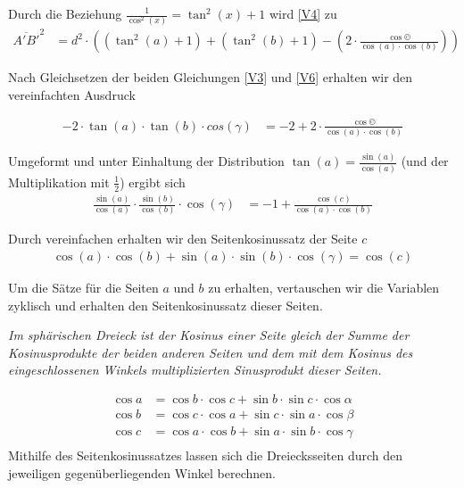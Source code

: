 \begin{refsection}
Durch die Beziehung $\frac{1}{\cos^{2}(x)}=\tan^{2}(x)+1$ wird \eqref{V4} zu 
\begin{align}
\overline{ A'B'}^{ 2 } &= d^{ 2 } \cdot \left(\left(\tan^{ 2 }(a) + 1\right) + \left(\tan^{ 2 }(b) + 1\right) - \left(2 \cdot \frac{\cos©}{\cos(a) \cdot \cos(b)}\right)\right)
\label {V6}
\end{align}

Nach Gleichsetzen der beiden Gleichungen \eqref{V3} und \eqref{V6} erhalten wir den vereinfachten Ausdruck 

\begin{align*}
-2 \cdot \tan(a) \cdot \tan(b) \cdot cos(\gamma) &= -2+2 \cdot \frac{\cos©}{\cos(a) \cdot \cos(b)}
\end{align*}


Umgeformt und unter Einhaltung der Distribution $\tan(a)=\frac{\sin(a)}{\cos(a)}$ (und der Multiplikation mit $\frac{1}{2}$) ergibt sich
\begin{align*}
\frac{\sin(a)}{\cos(a)} \cdot \frac{\sin(b)}{\cos(b)} \cdot \cos(\gamma) &= -1 + \frac{\cos(c)}{\cos(a) \cdot \cos(b)}
\end{align*}

Durch vereinfachen erhalten wir den Seitenkosinussatz der Seite $c$
\begin{align*}
\cos(a) \cdot \cos(b) + \sin(a) \cdot \sin(b) \cdot \cos(\gamma) = \cos(c)
\end{align*}

Um die Sätze für die Seiten $a$ und $b$ zu erhalten, vertauschen wir die Variablen zyklisch und erhalten den Seitenkosinussatz dieser Seiten.

\begin{satz}\textit{Im sphärischen Dreieck ist der Kosinus einer Seite gleich der Summe der Kosinusprodukte der beiden anderen Seiten und dem mit dem Kosinus des eingeschlossenen Winkels multiplizierten Sinusprodukt dieser Seiten.}
\label{skript:kugel:satz:Seitenkosinussatz}
\end{satz}
\begin{align*}
{\cos a} &= {\cos b} \cdot {\cos c} + {\sin b} \cdot {\sin c} \cdot {\cos \alpha}\\
{\cos b} &= {\cos c} \cdot {\cos a} + {\sin c} \cdot {\sin a} \cdot {\cos \beta}\\
{\cos c} &= {\cos a} \cdot {\cos b} + {\sin a} \cdot {\sin b} \cdot {\cos \gamma}\\
\end{align*}
Mithilfe des Seitenkosinussatzes lassen sich die Dreiecksseiten durch den jeweiligen gegenüberliegenden Winkel berechnen.



\end{refsection}
